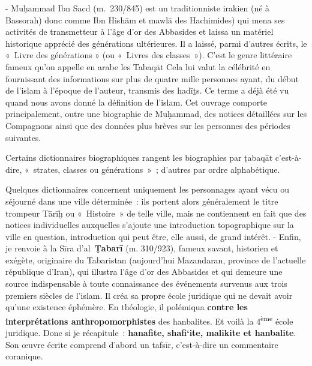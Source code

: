 - Muḥammad Ibn Sacd (m.~230/845) est un traditionniste irakien (né à
Bassorah) donc comme Ibn Hishām et mawlā des Hachimides) qui mena ses
activités de transmetteur à l'âge d'or des Abbasides et laissa un
matériel historique apprécié des générations ultérieures. Il a laissé,
parmi d'autres écrits, le «~Livre des générations » (ou «~Livres des classes~»). C'est le genre
littéraire fameux qu'on appelle en arabe les {Tabaqāt}  Cela lui valut la célébrité en fournissant des informations
sur plus de quatre mille personnes ayant, du début de l'islam à l'époque
de l'auteur, transmis des hadīṯs. Ce terme a déjà été vu quand nous
avons donné la définition de l'islam. Cet ouvrage comporte
principalement, outre une biographie de Muḥammad, des notices détaillées
sur les Compagnons ainsi que des données plus brèves sur les personnes
des périodes suivantes.
\begin{Def}
 Certains dictionnaires biographiques rangent les biographies
  par ṭabaqāt c'est-à-dire, «~strates, classes ou générations~»~;
  d'autres par ordre alphabétique. 
 

\end{Def}
Quelques dictionnaires concernent
  uniquement les personnages ayant vécu ou séjourné dans une ville
  déterminée~: ils portent alors généralement le titre trompeur {Tārīḫ} ou
  «~Histoire~» de telle ville, mais ne contiennent en fait que des
  notices individuelles auxquelles s'ajoute une introduction
  topographique sur la ville en question, introduction qui peut être,
  elle aussi, de grand intérêt.  
\FloatBarrier
- Enfin, je renvoie à la Sīra d'al~\textbf{Ṭabarī} (m. 310/923), fameux
savant, historien et exégète, originaire du Tabaristan (aujourd'hui
Mazandaran, province de l'actuelle république d'Iran), qui illustra
l'âge d'or des Abbasides et qui demeure une source indispensable à toute
connaissance des événements survenus aux trois premiers siècles de
l'islam. Il créa sa propre école juridique qui ne devait avoir qu'une
existence éphémère. En théologie, il polémiqua \textbf{contre les
interprétations anthropomorphistes} des hanbalites. Et voilà la
4\textsuperscript{ème} école juridique. Donc si je récapitule~:
\textbf{hanafite, shafi`ite, malikite et hanbalite}. Son œuvre écrite
comprend d'abord un {tafsīr}, c'est-à-dire un commentaire
coranique.


